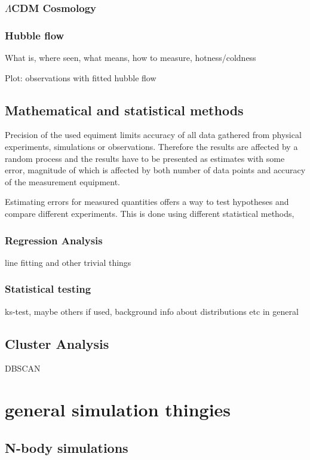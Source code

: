 \documentclass[english, oneside]{HYgradu}
\begin{document}
\subsection{$\Lambda$CDM Cosmology}


\subsection{Hubble flow}
What is, where seen, what means, how to measure, hotness/coldness

Plot: observations with fitted hubble flow


\section{Mathematical and statistical methods}
Precision of the used equiment limits accuracy of all data gathered from physical experiments, simulations or observations. Therefore the results are affected by a random process and the results have to be presented as estimates with some error, magnitude of which is affected by both number of data points and accuracy of the measurement equipment.\cite{bohm2010introduction}

Estimating errors for measured quantities offers a way to test hypotheses and compare different experiments. This is done using different statistical methods, %


\subsection{Regression Analysis}
line fitting and other trivial things

\subsection{Statistical testing}
ks-test, maybe others if used, background info about distributions etc in general

\section{Cluster Analysis}
DBSCAN

\chapter{general simulation thingies}
\section{N-body simulations}
\end{document}
